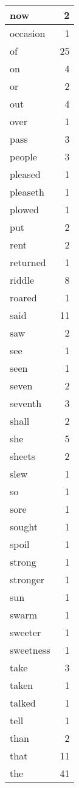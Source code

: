 \begin{center}
\begin{longtable}{l|r}
now & 2\\ \hline 
occasion & 1\\ \hline 
of & 25\\ \hline 
on & 4\\ \hline 
or & 2\\ \hline 
out & 4\\ \hline 
over & 1\\ \hline 
pass & 3\\ \hline 
people & 3\\ \hline 
pleased & 1\\ \hline 
pleaseth & 1\\ \hline 
plowed & 1\\ \hline 
put & 2\\ \hline 
rent & 2\\ \hline 
returned & 1\\ \hline 
riddle & 8\\ \hline 
roared & 1\\ \hline 
said & 11\\ \hline 
saw & 2\\ \hline 
see & 1\\ \hline 
seen & 1\\ \hline 
seven & 2\\ \hline 
seventh & 3\\ \hline 
shall & 2\\ \hline 
she & 5\\ \hline 
sheets & 2\\ \hline 
slew & 1\\ \hline 
so & 1\\ \hline 
sore & 1\\ \hline 
sought & 1\\ \hline 
spoil & 1\\ \hline 
strong & 1\\ \hline 
stronger & 1\\ \hline 
sun & 1\\ \hline 
swarm & 1\\ \hline 
sweeter & 1\\ \hline 
sweetness & 1\\ \hline 
take & 3\\ \hline 
taken & 1\\ \hline 
talked & 1\\ \hline 
tell & 1\\ \hline 
than & 2\\ \hline 
that & 11\\ \hline 
the & 41\\ \hline 

\end{longtable}
\end{center}
